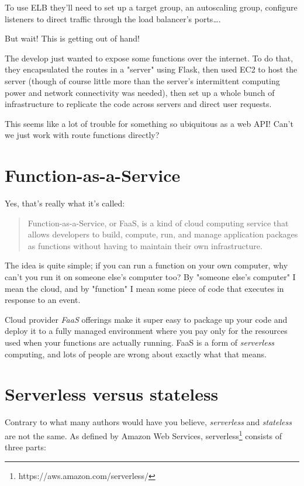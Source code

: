 \documentclass{article}
\newcommand{\noterm}[1]{\textit{#1}}
\newcommand{\term}[1]{\noterm{#1}\index{#1}}
\begin{document}
To use ELB they'll need to set up a target group, an autoscaling group, configure listeners to direct traffic through the load balancer's ports\ldots.

But wait!
This is getting out of hand!

The develop just wanted to expose some functions over the internet.
To do that, they encapsulated the routes in a "server" using Flask, then used EC2 to host the server (though of course little more than the server's intermittent computing power and network connectivity was needed), then set up a whole bunch of infrastructure to replicate the code across servers and direct user requests.

This seems like a lot of trouble for something so ubiquitous as a web API!
Can't we just work with route functions directly?

\section{Function-as-a-Service}

Yes, that's really what it's called:

\begin{quote}
  Function-as-a-Service, or FaaS, is a kind of cloud computing service that allows developers to build, compute, run, and manage application packages as functions without having to maintain their own infrastructure.~\cite{redhat-faas}
\end{quote}

The idea is quite simple; if you can run a function on your own computer, why can't you run it on someone else's computer too?
By "someone else's computer" I mean the cloud, and by "function" I mean some piece of code that executes in response to an event.

Cloud provider \term{FaaS} offerings make it super easy to package up your code and deploy it to a fully managed environment where you pay only for the resources used when your functions are actually running.
FaaS is a form of \term{serverless} computing, and lots of people are wrong about exactly what that means.

\section{Serverless versus stateless}

Contrary to what many authors would have you believe, \term{serverless} and \term{stateless} are not the same.
As defined by Amazon Web Services, serverless\footnote{https://aws.amazon.com/serverless/} consists of three parts:
\end{document}
